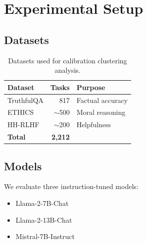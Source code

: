 \section{Experimental Setup}

\subsection{Datasets}

\begin{table}[h]
\centering
\begin{tabular}{@{}lrl@{}}
\toprule
Dataset & Tasks & Purpose \\
\midrule
TruthfulQA & 817 & Factual accuracy \\
ETHICS & $\sim$500 & Moral reasoning \\
HH-RLHF & $\sim$200 & Helpfulness \\
\midrule
\textbf{Total} & \textbf{2,212} & \\
\bottomrule
\end{tabular}
\caption{Datasets used for calibration clustering analysis.}
\label{tab:datasets}
\end{table}

\subsection{Models}

We evaluate three instruction-tuned models:
\begin{itemize}
    \item Llama-2-7B-Chat
    \item Llama-2-13B-Chat
    \item Mistral-7B-Instruct
\end{itemize}
